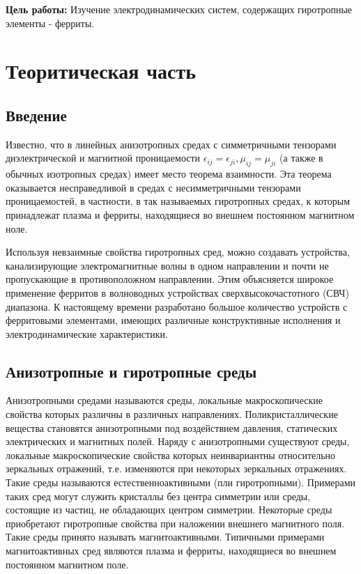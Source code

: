 
\newcommand{\vH}{\textbf{H}}
\newcommand{\vE}{\textbf{E}}
\newcommand{\vB}{\textbf{B}}
\newcommand{\vD}{\textbf{D}}
\newcommand{\vr}{\textbf{r}}
\newcommand{\vj}{\textbf{j}}
\newcommand{\vk}{\textbf{k}}
\newcommand{\vx}{\textbf{x}}
\newcommand{\vy}{\textbf{y}}
\newcommand{\vz}{\textbf{z}}


\def\labauthors{Карусевич А.А., Шиков А.П.}
\def\labgroup{440}
\def\labnumber{1}
\def\labtheme{Волноводные ферритовые устройства СВЧ диапазона}


\newpage

{\bfseries Цель работы:} 
Изучение электродинамических систем, содержащих гиротропные элементы - ферриты.

\section{Теоритическая часть}
\subsection{Введение}
Известно, что в линейных анизотропных средах с симметричными тензорами диэлектрической и магнитной проницаемости
$\epsilon_{ij} = \epsilon_{ji},\mu_{ij} = \mu_{ji}$ (а также в обычных изотропных средах) имеет место теорема взаимности. Эта теорема оказывается несправедливой в средах
с несимметричными тензорами проницаемостей, в частности, в так называемых гиротропных средах, к которым принадлежат
плазма и ферриты, находящиеся во внешнем постоянном магнитном ноле.

Используя невзаимные свойства гиротропных сред, можно создавать устройства, канализирующие электромагнитные волны в
одном направлении и почти не пропускающие в противоположном направлении. Этим объясняется широкое применение ферритов в
волноводных устройствах сверхвысокочастотного (СВЧ) диапазона. К настоящему времени разработано большое количество
устройств с ферритовыми элементами, имеющих различные конструктивные исполнения и электродинамические характеристики.

\subsection{Анизотропные и гиротропные среды}

Анизотропными средами называются среды, локальные макроскопические свойства которых различны в различных направлениях. Поликристаллические вещества становятся анизотропными
под воздействием давления, статических электрических и магнитных полей. Наряду с анизотропными существуют среды,
локальные макроскопические свойства которых неинвариантны относительно зеркальных отражений, т.е. изменяются при
некоторых зеркальных отражениях. Такие среды называются естественноактивными (пли гиротропными). Примерами таких сред
могут служить кристаллы без центра симметрии или среды, состоящие из частиц, не обладающих центром симметрии. Некоторые
среды приобретают гиротропные свойства при наложении внешнего магнитного поля. Такие среды принято называть
магнитоактивными. Типичными примерами магнитоактивных сред являются плазма и ферриты, находящиеся во внешнем постоянном
магнитном поле.

